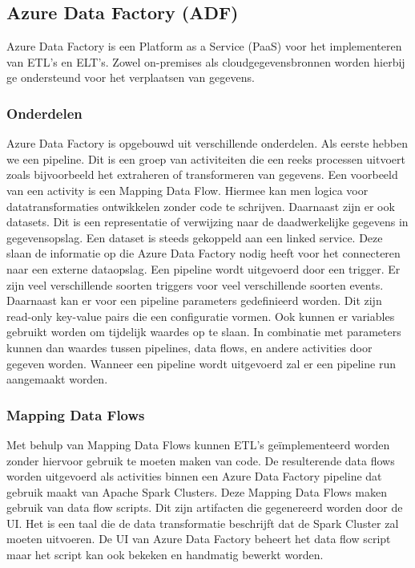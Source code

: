 \subsection{Azure Data Factory (ADF)}

Azure Data Factory is een Platform as a Service (PaaS) voor het implementeren van ETL's en ELT's. Zowel on-premises als cloudgegevensbronnen worden hierbij ge ondersteund voor het verplaatsen van gegevens.~\autocite{Rawat2019} 

\subsubsection{Onderdelen}

Azure Data Factory is opgebouwd uit verschillende onderdelen. Als eerste hebben we een pipeline. Dit is een groep van activiteiten die een reeks processen uitvoert zoals bijvoorbeeld het extraheren of transformeren van gegevens. Een voorbeeld van een activity is een Mapping Data Flow. Hiermee kan men logica voor datatransformaties ontwikkelen zonder code te schrijven. Daarnaast zijn er ook datasets. Dit is een representatie of verwijzing naar de daadwerkelijke gegevens in gegevensopslag. Een dataset is steeds gekoppeld aan een linked service. Deze slaan de informatie op die Azure Data Factory nodig heeft voor het connecteren naar een externe dataopslag. Een pipeline wordt uitgevoerd door een trigger. Er zijn veel verschillende soorten triggers voor veel verschillende soorten events. Daarnaast kan er voor een pipeline parameters gedefinieerd worden. Dit zijn read-only key-value pairs die een configuratie vormen. Ook kunnen er variables gebruikt worden om tijdelijk waardes op te slaan. In combinatie met parameters kunnen dan waardes tussen pipelines, data flows, en andere activities door gegeven worden. Wanneer een pipeline wordt uitgevoerd zal er een pipeline run aangemaakt worden.~\autocite{Microsoft2024a} 

\subsubsection{Mapping Data Flows}

Met behulp van Mapping Data Flows kunnen ETL's geïmplementeerd worden zonder hiervoor gebruik te moeten maken van code. De resulterende data flows worden uitgevoerd als activities binnen een Azure Data Factory pipeline dat gebruik maakt van Apache Spark Clusters. Deze Mapping Data Flows maken gebruik van data flow scripts. Dit zijn artifacten die gegenereerd worden door de UI. Het is een taal die de data transformatie beschrijft dat de Spark Cluster zal moeten uitvoeren. De UI van Azure Data Factory beheert het data flow script maar het script kan ook bekeken en handmatig bewerkt worden.~\autocite{Kromer2022a}

